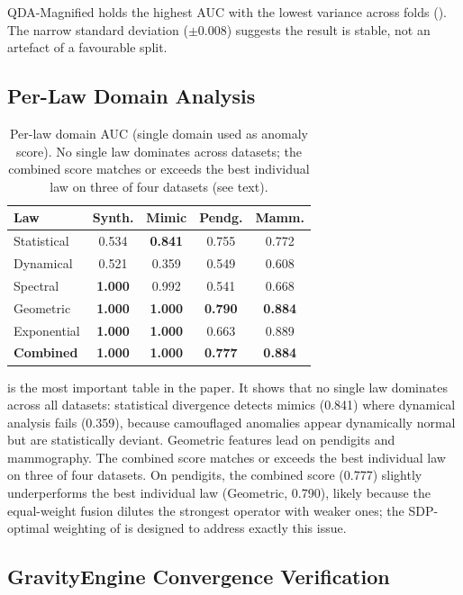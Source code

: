 \documentclass{article}
\begin{document}
QDA-Magnified holds the highest AUC with the lowest variance across folds (). The narrow standard deviation ($\pm 0.008$) suggests the result is stable, not an artefact of a favourable split.

\subsection{Per-Law Domain Analysis}

\begin{table}[t]
\centering
\caption{Per-law domain AUC (single domain used as anomaly score). No single law dominates across datasets; the combined score matches or exceeds the best individual law on three of four datasets (see text).}
\label{tab:perlaw}
\begin{tabular}{@{}lcccc@{}}
\toprule
\textbf{Law} & \textbf{Synth.} & \textbf{Mimic} & \textbf{Pendg.} & \textbf{Mamm.} \\
\midrule
Statistical & 0.534 & \textbf{0.841} & 0.755 & 0.772 \\
Dynamical & 0.521 & 0.359 & 0.549 & 0.608 \\
Spectral & \textbf{1.000} & 0.992 & 0.541 & 0.668 \\
Geometric & \textbf{1.000} & \textbf{1.000} & \textbf{0.790} & \textbf{0.884} \\
Exponential & \textbf{1.000} & \textbf{1.000} & 0.663 & 0.889 \\
\midrule
\textbf{Combined} & \textbf{1.000} & \textbf{1.000} & \textbf{0.777} & \textbf{0.884} \\
\bottomrule
\end{tabular}
\end{table}

 is the most important table in the paper. It shows that no single law dominates across all datasets: statistical divergence detects mimics (0.841) where dynamical analysis fails (0.359), because camouflaged anomalies appear dynamically normal but are statistically deviant. Geometric features lead on pendigits and mammography. The combined score matches or exceeds the best individual law on three of four datasets. On pendigits, the combined score (0.777) slightly underperforms the best individual law (Geometric, 0.790), likely because the equal-weight fusion dilutes the strongest operator with weaker ones; the SDP-optimal weighting of  is designed to address exactly this issue.

\subsection{GravityEngine Convergence Verification}
\label{ssec:convergence}
\end{document}
